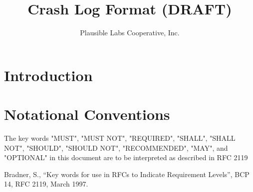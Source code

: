 \documentclass[11pt]{article}
\title{Crash Log Format (DRAFT)}
\author{Plausible Labs Cooperative, Inc.}
\begin{document}
\maketitle
\tableofcontents

\section{Introduction}

\section{Notational Conventions}

The key words "MUST", "MUST NOT", "REQUIRED", "SHALL", "SHALL NOT", "SHOULD", "SHOULD NOT", "RECOMMENDED", "MAY", and "OPTIONAL" in this document are to be interpreted as described in RFC 2119\cite{RFC2119}

\begin{thebibliography}{99}
 Bradner, S., ``Key words for use in RFCs to Indicate Requirement Levels'', BCP 14, RFC 2119, March 1997.
\end{thebibliography}
\end{document}
